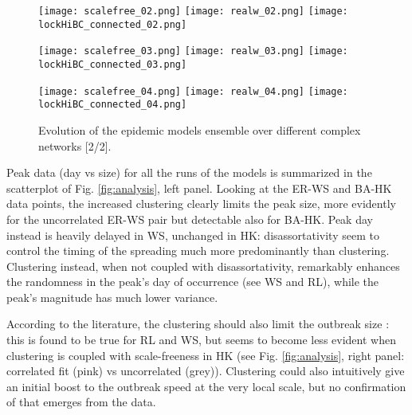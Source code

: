 \documentclass[DIV=12, BCOR=0pt]{scrartcl}  %
\begin{document}
  \begin{figure}[h!]
  	\centering 
  	
  	\texttt{[image: scalefree\_02.png]}
  	\texttt{[image: realw\_02.png]}
  	\texttt{[image: lockHiBC\_connected\_02.png]}
  	
  	\texttt{[image: scalefree\_03.png]}
  	\texttt{[image: realw\_03.png]}
  	\texttt{[image: lockHiBC\_connected\_03.png]}
  	
  	\texttt{[image: scalefree\_04.png]}
  	\texttt{[image: realw\_04.png]}
  	\texttt{[image: lockHiBC\_connected\_04.png]}
  	
  	\caption{Evolution of the epidemic models ensemble over different complex networks [2/2].}
  	\label{fig:outcomes1}
  \end{figure}
  \clearpage
 
  
  Peak data (day vs size) for all the runs of the models is summarized in the scatterplot of Fig. \ref{fig:analysis}, left panel. Looking at the ER-WS and BA-HK data points, the increased clustering clearly limits the peak size, more evidently for the uncorrelated ER-WS pair but detectable also for BA-HK. Peak day instead is heavily delayed in WS, unchanged in HK: disassortativity seem to control the timing of the spreading much more predominantly than clustering. Clustering instead, when not coupled with disassortativity, remarkably enhances the randomness in the peak's day of occurrence (see WS and RL), while the peak's magnitude has much lower variance.
  
  According to the literature, the clustering should also limit the outbreak size \citep{PastorSatorras}: this is found to be true for RL and WS, but seems to become less evident when clustering is coupled with scale-freeness in HK (see Fig. \ref{fig:analysis}, right panel: correlated fit (pink) vs uncorrelated (grey)). 
  Clustering could also intuitively give an initial boost to the outbreak speed at the very local scale, but no confirmation of that emerges from the data.
  
\end{document}
